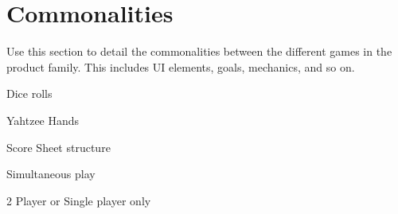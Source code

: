 \section{Commonalities}

Use this section to detail the commonalities between the different games in the product family. This includes UI elements, goals, mechanics, and so on.

Dice rolls

Yahtzee Hands

Score Sheet structure

Simultaneous play

2 Player or Single player only

